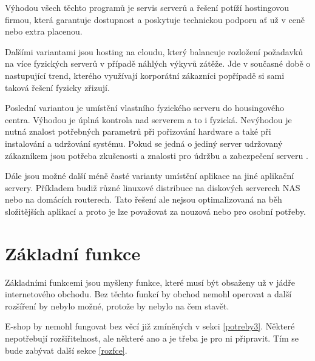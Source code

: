 \documentclass[11pt,twoside,a4paper]{book}
\begin{document}
Výhodou všech těchto programů je servis serverů a řešení potíží hostingovou firmou, která garantuje dostupnost a poskytuje technickou podporu ať už v ceně nebo extra placenou.

Dalšími variantami jsou hosting na cloudu, který balancuje rozložení požadavků na více fyzických serverů v případě náhlých výkyvů zátěže. Jde v současné době o nastupující trend, kterého využívají korporátní zákazníci popřípadě si sami taková řešení fyzicky zřizují.

Poslední variantou je umístění vlastního fyzického serveru do housingového centra. Výhodou je úplná kontrola nad serverem a to i fyzická. Nevýhodou je nutná znalost potřebných parametrů při pořizování hardware a také při instalování a udržování systému. Pokud se jedná o jediný server udržovaný zákazníkem jsou potřeba zkušenosti a znalosti pro údržbu a zabezpečení serveru \cite{hostingy}.

Dále jsou možné další méně časté varianty umístění aplikace na jiné aplikační servery. Příkladem budiž různé linuxové distribuce na diskových serverech NAS nebo na domácích routerech. Tato řešení ale nejsou optimalizovaná na běh složitějších aplikací a proto je lze považovat za nouzová nebo pro osobní potřeby. 





\section{Základní funkce}

Základními funkcemi jsou myšleny funkce, které musí být obsaženy už v jádře internetového obchodu. Bez těchto funkcí by obchod nemohl operovat a další rozšíření by nebylo možné, protože by nebylo na čem stavět. 

E-shop by nemohl fungovat bez věcí již zmíněných v sekci \ref{potreby3}. Některé nepotřebují rozšiřitelnost, ale některé ano a je třeba je pro ni připravit. Tím se bude zabývat další sekce \ref{rozfce}.
\end{document}
